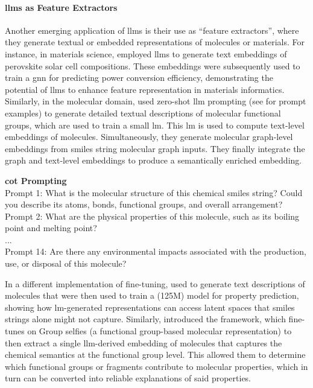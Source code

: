 \paragraph{\glspl{llm} as Feature Extractors} Another emerging application of \glspl{llm} is their use as \enquote{feature extractors}, where they generate textual or embedded representations of molecules or materials. For instance, in materials science, \textcite{aneesh2025semantic} employed \glspl{llm} to generate text embeddings of perovskite solar cell compositions. 
These embeddings were subsequently used to train a \gls{gnn} for predicting power conversion efficiency, demonstrating the potential of \glspl{llm} to enhance feature representation in materials informatics. 
Similarly, in the molecular domain, \textcite{srinivas2024crossmodal} used zero-shot \gls{llm} prompting (see  for prompt examples) to generate detailed textual descriptions of molecular functional groups, which are used to train a small \gls{lm}. This \gls{lm} is used to compute text-level embeddings of molecules. Simultaneously, they generate molecular graph-level embeddings from \gls{smiles} string molecular graph inputs. They finally integrate the graph and text-level embeddings to produce a semantically enriched embedding.
\begin{promptbox}\label{box: cot_prompting}
    \textbf{\gls{cot} Prompting}\autocite{srinivas2024crossmodal}\\
    Prompt 1: What is the molecular structure of this chemical \gls{smiles} string? Could you describe its atoms, bonds, functional groups, and overall arrangement? \\
    Prompt 2: What are the physical properties of this molecule, such as its boiling point and melting point?\\
    ...\\
    Prompt 14: Are there any environmental impacts associated with the production, use, or disposal of this molecule?
\end{promptbox}
In a different implementation of fine-tuning, \textcite{balaji2023gptmolberta} used  to generate text descriptions of molecules that were then used to train a  (125M) model for property prediction, showing how \gls{lm}-generated representations can access latent spaces that \gls{smiles} strings alone might not capture.
Similarly, \textcite{li2024unveiling} introduced the  framework, which fine-tunes \autocite{ahmad2022chemberta} on Group \gls{selfies} \autocite{cheng2023group} (a functional group-based molecular representation) to then extract a single \gls{llm}-derived embedding of molecules that captures the chemical semantics at the functional group level. This allowed them to determine which functional groups or fragments contribute to molecular properties, which in turn can be converted into reliable explanations of said properties.

